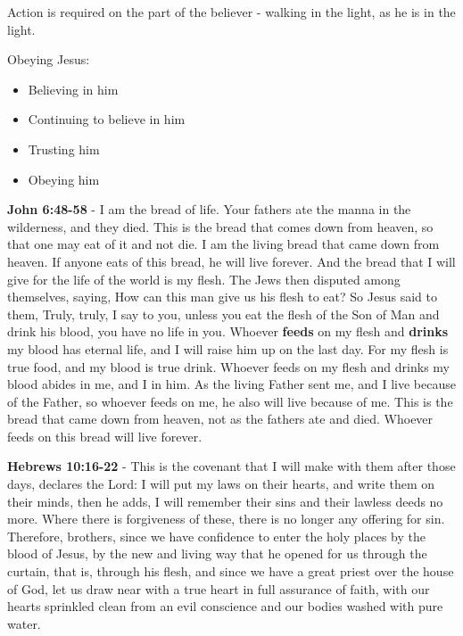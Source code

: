 \documentclass[11pt]{article}
\begin{document}
Action is required on the part of the believer - walking in the light, as he is in the light.

Obeying Jesus:
\begin{itemize}
\item Believing in him
\item Continuing to believe in him
\item Trusting him
\item Obeying him
\end{itemize}

\textbf{John 6:48-58} - I am the bread of life. Your fathers ate the manna in the wilderness, and they died. This is the bread that comes down from heaven, so that one may eat of it and not die. I am the living bread that came down from heaven. If anyone eats of this bread, he will live forever. And the bread that I will give for the life of the world is my flesh. The Jews then disputed among themselves, saying, How can this man give us his flesh to eat? So Jesus said to them, Truly, truly, I say to you, unless you eat the flesh of the Son of Man and drink his blood, you have no life in you. Whoever \textbf{feeds} on my flesh and \textbf{drinks} my blood has eternal life, and I will raise him up on the last day. For my flesh is true food, and my blood is true drink. Whoever feeds on my flesh and drinks my blood abides in me, and I in him. As the living Father sent me, and I live because of the Father, so whoever feeds on me, he also will live because of me. This is the bread that came down from heaven, not as the fathers ate and died. Whoever feeds on this bread will live forever.

\textbf{Hebrews 10:16-22} - This is the covenant that I will make with them after those days, declares the Lord: I will put my laws on their hearts, and write them on their minds, then he adds, I will remember their sins and their lawless deeds no more.  Where there is forgiveness of these, there is no longer any offering for sin.  Therefore, brothers, since we have confidence to enter the holy places by the blood of Jesus, by the new and living way that he opened for us through the curtain, that is, through his flesh, and since we have a great priest over the house of God, let us draw near with a true heart in full assurance of faith, with our hearts sprinkled clean from an evil conscience and our bodies washed with pure water.
\end{document}

